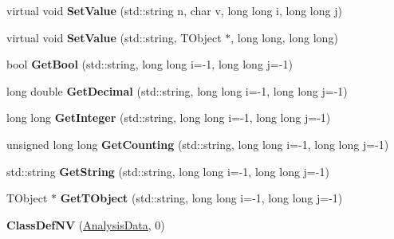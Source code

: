 \begin{DoxyCompactItemize}
\item 
\hypertarget{class_h_a_l_1_1_analysis_data_ab2c88f9674ccfb1ca2adcdff2738b2de}{virtual void {\bfseries Set\-Value} (std\-::string n, char v, long long i, long long j)}\label{class_h_a_l_1_1_analysis_data_ab2c88f9674ccfb1ca2adcdff2738b2de}

\item 
\hypertarget{class_h_a_l_1_1_analysis_data_a3042a2552556d81670eed248a7f5d6f0}{virtual void {\bfseries Set\-Value} (std\-::string, T\-Object $\ast$, long long, long long)}\label{class_h_a_l_1_1_analysis_data_a3042a2552556d81670eed248a7f5d6f0}

\item 
\hypertarget{class_h_a_l_1_1_analysis_data_abe2d8a75a7d28cc0cf11b9ee5b748330}{bool {\bfseries Get\-Bool} (std\-::string, long long i=-\/1, long long j=-\/1)}\label{class_h_a_l_1_1_analysis_data_abe2d8a75a7d28cc0cf11b9ee5b748330}

\item 
\hypertarget{class_h_a_l_1_1_analysis_data_a7e48c92a59290a82365bc9ff20e3dd77}{long double {\bfseries Get\-Decimal} (std\-::string, long long i=-\/1, long long j=-\/1)}\label{class_h_a_l_1_1_analysis_data_a7e48c92a59290a82365bc9ff20e3dd77}

\item 
\hypertarget{class_h_a_l_1_1_analysis_data_ad70de3feecd3a33dd478b621ffb66ad3}{long long {\bfseries Get\-Integer} (std\-::string, long long i=-\/1, long long j=-\/1)}\label{class_h_a_l_1_1_analysis_data_ad70de3feecd3a33dd478b621ffb66ad3}

\item 
\hypertarget{class_h_a_l_1_1_analysis_data_aea7be779e48682868d4edce1033c5ca6}{unsigned long long {\bfseries Get\-Counting} (std\-::string, long long i=-\/1, long long j=-\/1)}\label{class_h_a_l_1_1_analysis_data_aea7be779e48682868d4edce1033c5ca6}

\item 
\hypertarget{class_h_a_l_1_1_analysis_data_a1b75108a77922daf094da3e872ff9395}{std\-::string {\bfseries Get\-String} (std\-::string, long long i=-\/1, long long j=-\/1)}\label{class_h_a_l_1_1_analysis_data_a1b75108a77922daf094da3e872ff9395}

\item 
\hypertarget{class_h_a_l_1_1_analysis_data_ac6f7f829cf6fc48aee3c9b646e8d08c3}{T\-Object $\ast$ {\bfseries Get\-T\-Object} (std\-::string, long long i=-\/1, long long j=-\/1)}\label{class_h_a_l_1_1_analysis_data_ac6f7f829cf6fc48aee3c9b646e8d08c3}

\item 
\hypertarget{class_h_a_l_1_1_analysis_data_a0d63364d678190ac69e46922ad445b8a}{{\bfseries Class\-Def\-N\-V} (\hyperlink{class_h_a_l_1_1_analysis_data}{Analysis\-Data}, 0)}\label{class_h_a_l_1_1_analysis_data_a0d63364d678190ac69e46922ad445b8a}

\end{DoxyCompactItemize}
